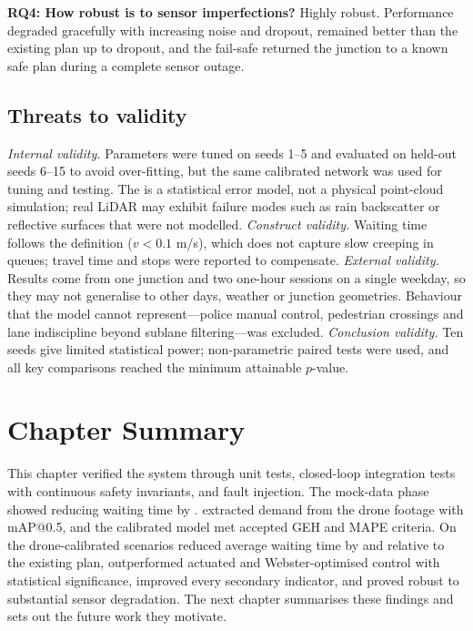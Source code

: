 \textbf{RQ4: How robust is \prism{} to sensor imperfections?} Highly robust. Performance degraded gracefully with increasing noise and dropout, remained better than the existing plan up to  dropout, and the fail-safe returned the junction to a known safe plan during a complete sensor outage.

\subsection{Threats to validity}\label{sec:threats}

\textit{Internal validity.} Parameters were tuned on seeds 1--5 and evaluated on held-out seeds 6--15 to avoid over-fitting, but the same calibrated network was used for tuning and testing. The \vls{} is a statistical error model, not a physical point-cloud simulation; real LiDAR may exhibit failure modes such as rain backscatter or reflective surfaces that were not modelled.
\textit{Construct validity.} Waiting time follows the \sumo{} definition ($v<0.1$ m/s), which does not capture slow creeping in queues; travel time and stops were reported to compensate.
\textit{External validity.} Results come from one junction and two one-hour sessions on a single weekday, so they may not generalise to other days, weather or junction geometries. Behaviour that the model cannot represent---police manual control, pedestrian crossings and lane indiscipline beyond sublane filtering---was excluded.
\textit{Conclusion validity.} Ten seeds give limited statistical power; non-parametric paired tests were used, and all key comparisons reached the minimum attainable $p$-value.

\section{Chapter Summary}

This chapter verified the system through  unit tests, closed-loop integration tests with continuous safety invariants, and fault injection. The mock-data phase showed \prism{} reducing waiting time by . \dtx{} extracted demand from the drone footage with  mAP@0.5, and the calibrated model met accepted GEH and MAPE criteria. On the drone-calibrated scenarios \prism{} reduced average waiting time by  and  relative to the existing plan, outperformed actuated and Webster-optimised control with statistical significance, improved every secondary indicator, and proved robust to substantial sensor degradation. The next chapter summarises these findings and sets out the future work they motivate.
